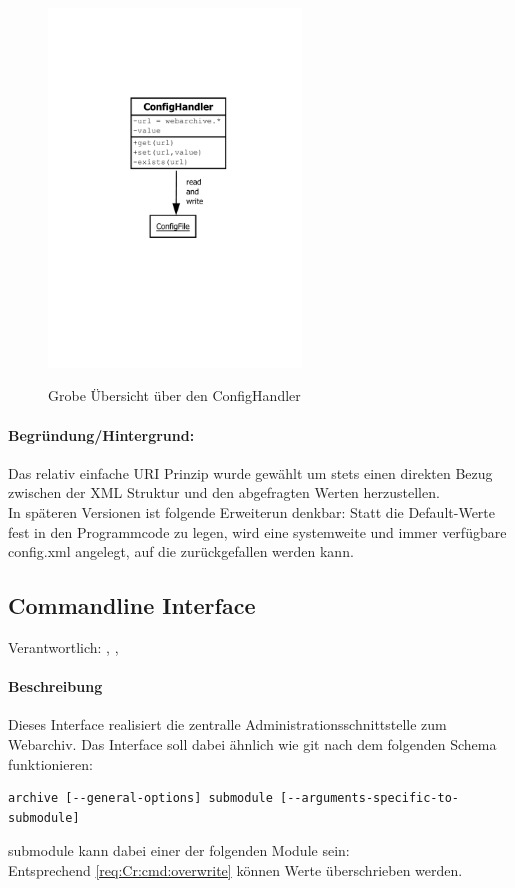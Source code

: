 \begin{figure}[h]
\includegraphics[width=0.6\textwidth]{design/backend/gfx/ConfigHandler.pdf}
\label{sub:confighandler}
\caption{Grobe Übersicht über den ConfigHandler}
\end{figure}

\paragraph{Begründung/Hintergrund:}
\label{par:begr_ndung}
Das relativ einfache URI Prinzip wurde gewählt um stets einen direkten
Bezug zwischen der XML Struktur und den abgefragten Werten herzustellen.
\\
In späteren Versionen ist folgende Erweiterun denkbar: Statt die
Default-Werte fest in den Programmcode zu legen, wird eine systemweite
und immer verfügbare config.xml angelegt, auf die zurückgefallen werden
kann.

\newpage
\subsection{Commandline Interface}
\label{sub:commandline_interface}
Verantwortlich: \flo, \ciii, \ci
\paragraph{Beschreibung}
\label{par:beschreibung}
Dieses Interface realisiert die zentralle Administrationsschnittstelle zum Webarchiv. 
Das Interface soll dabei ähnlich wie git nach dem folgenden Schema funktionieren:
\begin{verbatim}
archive [--general-options] submodule [--arguments-specific-to-submodule]
\end{verbatim}
submodule kann dabei einer der folgenden Module sein:
\\
Entsprechend \ref{req:Cr:cmd:overwrite} können Werte überschrieben werden.

